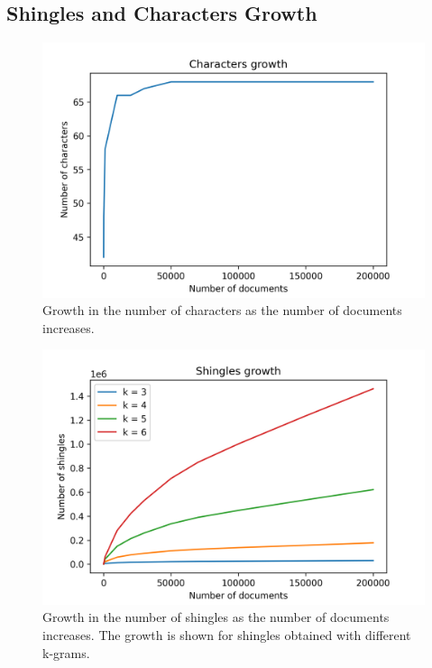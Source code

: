 \documentclass[runningheads]{llncs}
\begin{document}
\subsection{Shingles and Characters Growth}
\label{subsec:experiments:shingles}

\begin{figure}
  \center
  \includegraphics[width=1\textwidth]{../img/char_growth.png}
  \caption{Growth in the number of characters as the number of documents increases.} 
  \label{fig:experiments:char_growth}
\end{figure}

\begin{figure}
  \center
  \includegraphics[width=1\textwidth]{../img/shingles_growth.png}
  \caption{Growth in the number of shingles as the number of documents increases. The growth is shown for shingles obtained with different k-grams.} 
  \label{fig:experiments:shingles_growth}
\end{figure}
\end{document}
